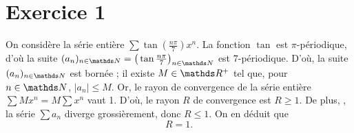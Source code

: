 \section{Exercice 1}

On considère la série entière $\sum \tan\left( \frac{n \pi}{7} \right) x^n$. La fonction $\tan$\/ est $\pi$-périodique, d'où la suite $(a_n)_{n\in\N} = \big(\tan \frac{n\pi}{7}\big)_{n \in \N}$\/ est $7$-périodique. D'où, la suite $(a_n)_{n\in\N}$\/ est bornée ; il existe $M \in \R^+$\/ tel que, pour $n \in \N$, $|a_n| \le M$.
Or, le rayon de convergence de la série entière $\sum M x^n = M \sum x^n$\/ vaut 1. D'où, le rayon $R$\/ de convergence est $R \ge 1$.
De plus, , la série $\sum a_n$\/ diverge grossièrement, donc $R \le 1$. On en déduit que  \[
	\boxed{R = 1.}
\]

